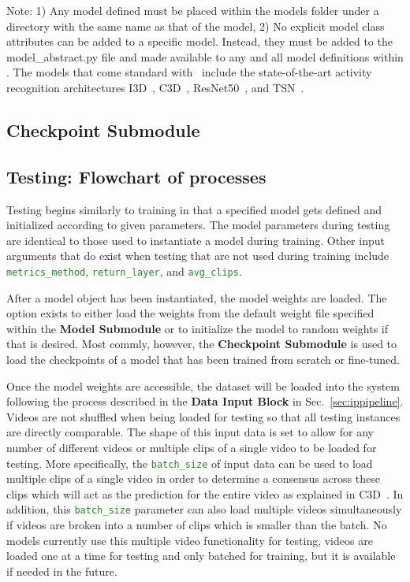 \documentclass{llncs}
\begin{document}
Note: 1) Any model defined must be placed within the models folder under a directory with the same name as that of the model,
2) No explicit model class attributes can be added to a specific model. Instead, they must be added to the model\_abstract.py file and made available to any and all model definitions within \acro.
The models that come standard with \acro~include the state-of-the-art activity recognition architectures I3D~\cite{}, C3D~\cite{}, ResNet50~\cite{}, and TSN~\cite{}.

\subsection{Checkpoint Submodule}
\label{sec:checkpoint}

\subsection{Testing: Flowchart of processes}
\label{sec:testing}

Testing begins similarly to training in that a specified model gets defined and initialized according to given parameters.
The model parameters during testing are identical to those used to instantiate a model during training.
Other input arguments that do exist when testing that are not used during training include \texttt{\textcolor{ForestGreen}{metrics\_method}}, \texttt{\textcolor{ForestGreen}{return\_layer}}, and \texttt{\textcolor{ForestGreen}{avg\_clips}}.

After a model object has been instantiated, the model weights are loaded.
The option exists to either load the weights from the default weight file specified within the \textbf{Model Submodule} or to initialize the model to random weights if that is desired.
Most commly, however, the \textbf{Checkpoint Submodule} is used to load the checkpoints of a model that has been trained from scratch or fine-tuned.

Once the model weights are accessible, the dataset will be loaded into the system following the process described in the \textbf{Data Input Block} in Sec.~\ref{sec:ippipeline}.
Videos are not shuffled when being loaded for testing so that all testing instances are directly comparable.
The shape of this input data is set to allow for any number of different videos or multiple clips of a single video to be loaded for testing.
More specifically, the \texttt{\textcolor{ForestGreen}{batch\_size}} of input data can be used to load multiple clips of a single video in order to determine a consensus across these clips which will act as the prediction for the entire video as explained in C3D~\cite{}.
In addition, this \texttt{\textcolor{ForestGreen}{batch\_size}} parameter can also load multiple videos simultaneously if videos are broken into a number of clips which is smaller than the batch.
No models currently use this multiple video functionality for testing, videos are loaded one at a time for testing and only batched for training, but it is available if needed in the future.
\end{document}
